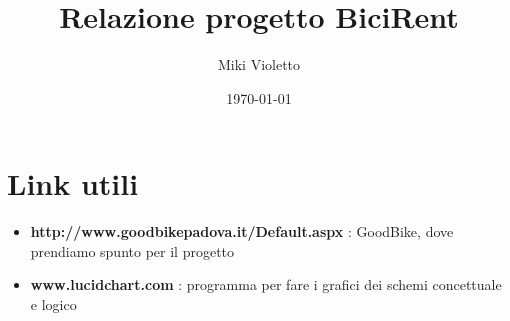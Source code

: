 \documentclass[a4paper,twoside]{article}
\author{Miki Violetto}
\title{Relazione progetto BiciRent}
\date{\today}
\begin{document}
\maketitle

\newpage
\tableofcontents

\newpage
\section{Link utili}
\begin{itemize}
\item \textbf{http://www.goodbikepadova.it/Default.aspx} : GoodBike, dove prendiamo spunto per il progetto
\item \textbf{www.lucidchart.com} : programma per fare i grafici dei schemi concettuale e logico
\end{itemize}
\end{document}
